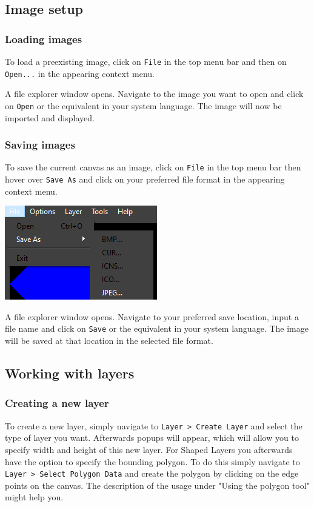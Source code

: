 \documentclass[a4paper, 12pt]{article}
\begin{document}
\subsection{Image setup}
\subsubsection{Loading images}
To load a preexisting image, click on \texttt{File} in the top menu bar and then on \texttt{Open...} in the appearing context menu.

A file explorer window opens. Navigate to the image you want to open and click on \texttt{Open} or the equivalent in your system language. The image will now be imported and displayed.

\subsubsection{Saving images}
To save the current canvas as an image, click on \texttt{File} in the top menu bar then hover over \texttt{Save As} and click on your preferred file format in the appearing context menu.
\begin{center}
\includegraphics[width=0.3\linewidth,keepaspectratio]{assets/file-save}
\end{center}

A file explorer window opens. Navigate to your preferred save location, input a file name and click on \texttt{Save} or the equivalent in your system language. The image will be saved at that location in the selected file format.

\subsection{Working with layers}
\subsubsection{Creating a new layer}
To create a new layer, simply navigate to \texttt{Layer > Create Layer} and select the type of layer you want. Afterwards popups will appear, which will allow you to specify width and height of this new layer.
For Shaped Layers you afterwards have the option to specify the bounding polygon. To do this simply navigate to \texttt{Layer > Select Polygon Data} and create the polygon by clicking on the edge points on the canvas. The description of the usage under "Using the polygon tool" might help you.
\end{document}
